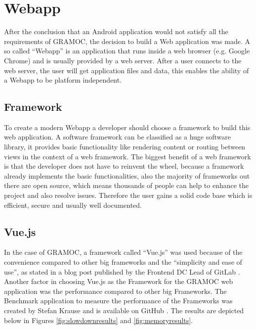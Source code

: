 \chapter{Webapp}
\label{ch:Webapp}

\author{Nico Leidenfrost}
%
After the conclusion that an Android application would not satisfy all the requirements of GRAMOC, the decision to build a Web application was made. A so called ``Webapp'' is an application that runs inside a web browser (e.g. Google Chrome) and is usually provided by a web server. After a user connects to the web server, the user will get application files and data, this enables the ability of a Webapp to be platform independent.

\section{Framework}
To create a modern Webapp a developer should choose a framework to build this web application. A software framework can be classified as a huge software library, it provides basic functionality like rendering content or routing between views in the context of a web framework. The biggest benefit of a web framework is that the developer does not have to reinvent the wheel, because a framework already implements the basic functionalities, also the majority of frameworks out there are open source, which means thousands of people can help to enhance the project and also resolve issues. Therefore the user gains a solid code base which is efficient, secure and usually well documented.

\section{Vue.js}
In the case of GRAMOC, a framework called ``Vue.js'' was used because of the convenience compared to other big frameworks and the ``simplicity and ease of use'', as stated in a blog post published by the Frontend DC Lead of GitLab \autocite{Vue} \autocite{WhyVue} \autocite{GitLab}. Another factor in choosing Vue.js as the Framework for the GRAMOC web application was the performance compared to other big Frameworks. The Benchmark application to measure the performance of the Frameworks was created by Stefan Krause and is available on GitHub \autocite{FrameworkBenchmark}. The results are depicted below in Figures \ref{fig:slowdownresults} and \ref{fig:memoryresults}.

\frameworkdata

